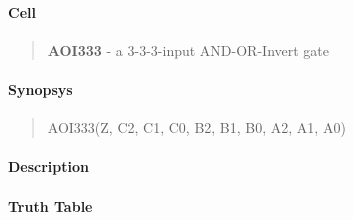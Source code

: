 \label{AOI333}
\paragraph{Cell}
\begin{quote}
    \textbf{AOI333} - a 3-3-3-input AND-OR-Invert gate
\end{quote}

\paragraph{Synopsys}
\begin{quote}
    AOI333(Z, C2, C1, C0, B2, B1, B0, A2, A1, A0)
\end{quote}

\paragraph{Description}

%

\paragraph{Truth Table}


